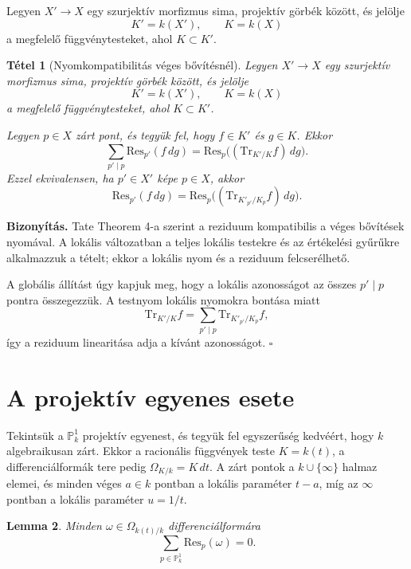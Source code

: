 \documentclass[a4paper,12pt]{article}
\theoremstyle{definition}
\newenvironment{biz}{\par\noindent\textbf{Bizonyítás.}\enspace\ignorespaces}
{\hfill$\square$\par}
\theoremstyle{plain}
\newtheorem{theorem}{Tétel}[section]
\newtheorem{lemma}[theorem]{Lemma}
\theoremstyle{remark}
\newcommand{\Res}{\mathrm{Res}}
\newcommand{\Tr}{\mathrm{Tr}}
\begin{document}
Legyen $X'\to X$ egy szurjektív morfizmus sima, projektív görbék között, és jelölje
\[
K'=k(X'),\qquad K=k(X)
\]
a megfelelő függvénytesteket, ahol $K\subset K'$.

\begin{theorem}[Nyomkompatibilitás véges bővítésnél]
\label{thm:trace_compat}
Legyen $X'\to X$ egy szurjektív morfizmus sima, projektív görbék között, és jelölje
\[
K'=k(X'),\qquad K=k(X)
\]
a megfelelő függvénytesteket, ahol $K\subset K'$.

Legyen $p\in X$ zárt pont, és tegyük fel, hogy $f\in K'$ és $g\in K$.
Ekkor
\[
\sum_{p'\mid p}\Res_{p'}(f\,dg)
=
\Res_p\bigl((\Tr_{K'/K}f)\,dg\bigr).
\]
Ezzel ekvivalensen, ha $p'\in X'$ képe $p\in X$, akkor
\[
\Res_{p'}(f\,dg)=\Res_p\bigl((\Tr_{K'_{p'}/K_p}f)\,dg\bigr).
\]
\end{theorem}

\begin{biz}
Tate Theorem 4-a szerint a reziduum kompatibilis a véges bővítések nyomával. A lokális változatban a teljes lokális testekre és az értékelési gyűrűkre alkalmazzuk a tételt; ekkor a lokális nyom és a reziduum felcserélhető.

A globális állítást úgy kapjuk meg, hogy a lokális azonosságot az összes $p'\mid p$ pontra összegezzük. A testnyom lokális nyomokra bontása miatt
\[
\Tr_{K'/K}f=\sum_{p'\mid p}\Tr_{K'_{p'}/K_p}f,
\]
így a reziduum linearitása adja a kívánt azonosságot.
\end{biz}
\section{A projektív egyenes esete}

Tekintsük a $\mathbb{P}^1_k$ projektív egyenest, és tegyük fel egyszerűség kedvéért, hogy $k$ algebraikusan zárt. Ekkor a racionális függvények teste $K=k(t)$, a differenciálformák tere pedig $\Omega_{K/k}=K\,dt$. A zárt pontok a $k\cup\{\infty\}$ halmaz elemei, és minden véges $a\in k$ pontban a lokális paraméter $t-a$, míg az $\infty$ pontban a lokális paraméter $u=1/t$.

\begin{lemma}
\label{lem:P1}
Minden $\omega\in\Omega_{k(t)/k}$ differenciálformára
\[
\sum_{p\in\mathbb{P}^1_k} \Res_p(\omega)=0.
\]
\end{lemma}
\end{document}
